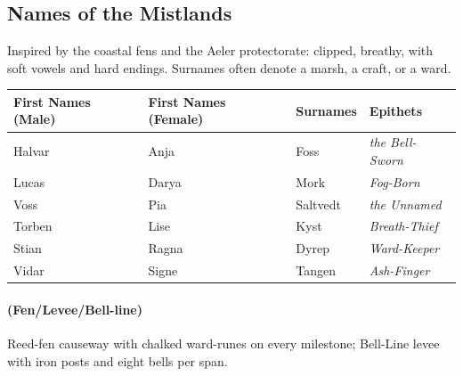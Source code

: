 \subsection*{Names of the Mistlands}
\label{sec:mistlands-names}

Inspired by the coastal fens and the Aeler protectorate: clipped, breathy, with soft vowels and hard endings. Surnames often denote a marsh, a craft, or a ward.

\begin{longtable}{|p{}|p{}|p{}|p{}|}
\hline
\textbf{First Names (Male)} & \textbf{First Names (Female)} & \textbf{Surnames} & \textbf{Epithets} \\
\hline
Halvar & Anja & Foss & \textit{the Bell-Sworn} \\
\hline
Lucas & Darya & Mork & \textit{Fog-Born} \\
\hline
Voss & Pia & Saltvedt & \textit{the Unnamed} \\
\hline
Torben & Lise & Kyst & \textit{Breath-Thief} \\
\hline
Stian & Ragna & Dyrep & \textit{Ward-Keeper} \\
\hline
Vidar & Signe & Tangen & \textit{Ash-Finger} \\
\hline
\end{longtable}

\paragraph*{(Fen/Levee/Bell-line)} Reed-fen causeway with chalked ward-runes on every milestone; Bell-Line levee with iron posts and eight bells per span.

